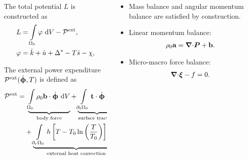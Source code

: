 \begin{frame}
  \vspace{-1.5em}
  \begin{columns}[T]
    \begin{column}{0.6\textwidth}
      The total potential $L$ is constructed as
      \begin{align*}
        L       & = \int\limits_{\Omega_0} \varphi \text{ d}V - \mathcal{P}^\text{ext}, \\
        \varphi & = \dot{k} + \dot{u} + \Delta^* - T\dot{s} - \chi,                  
      \end{align*}
      
      The external power expenditure $\mathcal{P}^\text{ext}(\dot{\boldsymbol{\upphi}}, T)$ is defined as
      \begin{equation*}
        \begin{aligned}
          \mathcal{P}^\text{ext} = & \ \underbrace{\int\limits_{\body_0} \rho_0 \btb \cdot \defrate \diff{V}}_\text{body force} + \underbrace{\int\limits_{\partial_t\body_0} \btt \cdot \defrate \diff{A}}_\text{surface traction} + \underbrace{\int\limits_{\partial_h\body_0} \bar{h}_n\ln\left( \dfrac{T}{T_0} \right) \diff{A}}_\text{external heat flux} \\
                                   & + \underbrace{\int\limits_{\partial_r\body_0} h\left[ T - T_0 \ln\left( \dfrac{T}{T_0} \right) \right] \diff{A}}_\text{external heat convection} - \underbrace{\int\limits_{\body_0} \rho_0 q \ln\left( \dfrac{T}{T_0} \right) \diff{V}}_\text{heat source},                                                               
        \end{aligned}
      \end{equation*}
    \end{column}
    \pause
    \begin{column}{0.4\textwidth}
      \begin{itemize}
        \item Mass balance and angular momentum balance are satisfied by construction.
        \item Linear momentum balance:
              \begin{align*}
                \rho_0\textbf{a} = {\boldsymbol{\nabla} \cdot}\boldsymbol{P} + \textbf{b}.
              \end{align*}
        \item Micro-macro force balance:
              \begin{align*}
                {\boldsymbol{\nabla}\cdot} \boldsymbol{\xi} - f = 0.
              \end{align*}

\end{itemize}
\end{column}
\end{columns}
\end{frame}
